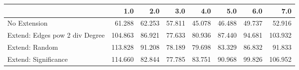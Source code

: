 \begin{tabular}{lrrrrrrr}
\toprule
{} &     1.0 &    2.0 &    3.0 &    4.0 &    5.0 &    6.0 &     7.0 \\
\midrule
No Extension                   &  61.288 & 62.253 & 57.811 & 45.078 & 46.488 & 49.737 &  52.916 \\
Extend: Edges pow 2 div Degree & 104.863 & 86.921 & 77.633 & 80.936 & 87.440 & 94.681 & 103.932 \\
Extend: Random                 & 113.828 & 91.208 & 78.189 & 79.698 & 83.329 & 86.832 &  91.833 \\
Extend: Significance           & 114.660 & 82.844 & 77.785 & 83.751 & 90.968 & 99.826 & 106.952 \\
\bottomrule
\end{tabular}
